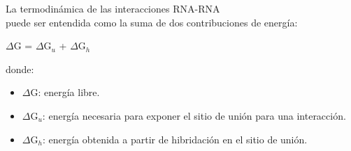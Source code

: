 \par La termodinámica de las interacciones RNA-RNA \\
\cite{freeEnergy} puede ser entendida como la suma de dos contribuciones de energía:
\begin{center}
	$\Delta$G = $\Delta$G$_u$ + $\Delta$G$_h$ 
\end{center}
donde:
\begin{itemize}
	\item $\Delta$G: energía libre.
	\item $\Delta$G$_u$: energía necesaria para exponer el sitio de unión para una interacción. 
	\item $\Delta$G$_h$: energía obtenida a partir de hibridación en el sitio de unión.
\end{itemize}


